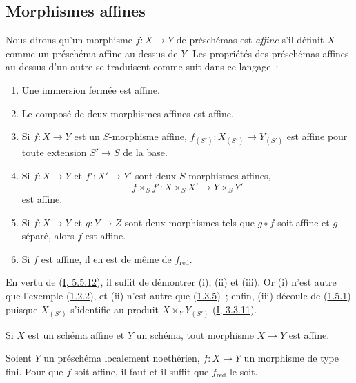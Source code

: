\subsection{Morphismes affines}
\label{II.1.6-fr}

\begin{env}[1.6.1]
\label{II.1.6.1-fr}
Nous dirons qu'un morphisme $f:X\to Y$ de préschémas est \emph{affine} s'il
définit $X$ comme un préschéma affine au-dessus de $Y$. Les propriétés des
préschémas affines au-dessus d'un autre se traduisent comme suit dans ce
langage~:
\end{env}

\begin{proposition}[1.6.2]
\label{II.1.6.2-fr}
\begin{enumerate}
  \item[\rm(i)] Une immersion fermée est affine.
  \item[\rm(ii)] Le composé de deux morphismes affines est affine.
  \item[\rm(iii)] Si $f:X\to Y$ est un $S$-morphisme affine,
    $f_{(S')}:X_{(S')}\to Y_{(S')}$ est affine pour toute extension $S'\to S$
    de la base.
  \item[\rm(iv)] Si $f:X\to Y$ et $f':X'\to Y'$ sont deux $S$-morphismes
    affines,
    \[
      f\times_S f':X\times_S X'\to Y\times_S Y'
    \]
    est affine.
  \item[\rm(v)] Si $f:X\to Y$ et $g:Y\to Z$ sont deux morphismes tels que
    $g\circ f$ soit affine et $g$ séparé, alors $f$ est affine.
  \item[\rm(vi)] Si $f$ est affine, il en est de même de
    $f_{\mathrm{red}}$.
\end{enumerate}
\end{proposition}

En vertu de (\hyperref[I.5.5.12-fr]{I, 5.5.12}), il suffit de démontrer (i),
(ii) et (iii). Or (i) n'est autre que l'exemple
(\hyperref[II.1.2.2-fr]{1.2.2}), et (ii) n'est autre que
(\hyperref[II.1.3.5-fr]{1.3.5})~; enfin, (iii) découle de
(\hyperref[II.1.5.1-fr]{1.5.1}) puisque $X_{(S')}$ s'identifie au produit
$X\times_Y Y_{(S')}$ (\hyperref[I.3.3.11-fr]{I, 3.3.11}).

\begin{corollary}[1.6.3]
\label{II.1.6.3-fr}
Si $X$ est un schéma affine et $Y$ un schéma, tout morphisme $X\to Y$ est
affine.
\end{corollary}

\begin{proposition}[1.6.4]
\label{II.1.6.4-fr}
Soient $Y$ un préschéma localement noethérien, $f:X\to Y$ un morphisme de type
fini. Pour que $f$ soit affine, il faut et il suffit que $f_{\mathrm{red}}$ le
soit.
\end{proposition}

